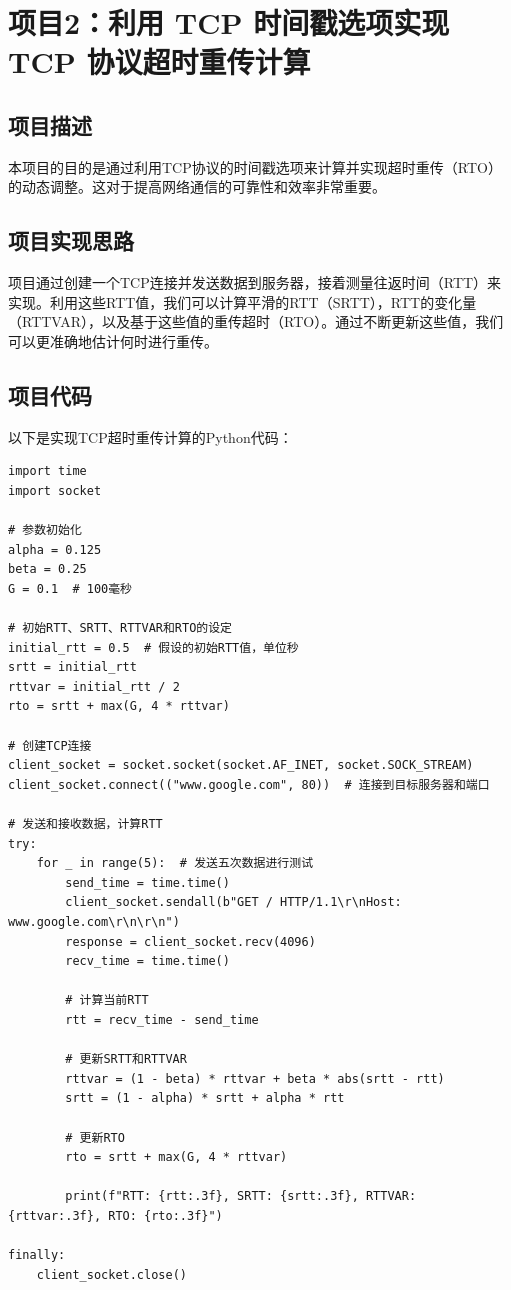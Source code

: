 \documentclass[UTF8,titlepage]{ctexart}
\numberwithin{figure}{section}
\begin{document}
\section{项目2：利用 TCP 时间戳选项实现 TCP 协议超时重传计算}

\subsection{项目描述}
本项目的目的是通过利用TCP协议的时间戳选项来计算并实现超时重传（RTO）的动态调整。这对于提高网络通信的可靠性和效率非常重要。

\subsection{项目实现思路}
项目通过创建一个TCP连接并发送数据到服务器，接着测量往返时间（RTT）来实现。利用这些RTT值，我们可以计算平滑的RTT（SRTT），RTT的变化量（RTTVAR），以及基于这些值的重传超时（RTO）。通过不断更新这些值，我们可以更准确地估计何时进行重传。

\subsection{项目代码}
以下是实现TCP超时重传计算的Python代码：

\begin{verbatim}
import time
import socket

# 参数初始化
alpha = 0.125
beta = 0.25
G = 0.1  # 100毫秒

# 初始RTT、SRTT、RTTVAR和RTO的设定
initial_rtt = 0.5  # 假设的初始RTT值，单位秒
srtt = initial_rtt
rttvar = initial_rtt / 2
rto = srtt + max(G, 4 * rttvar)

# 创建TCP连接
client_socket = socket.socket(socket.AF_INET, socket.SOCK_STREAM)
client_socket.connect(("www.google.com", 80))  # 连接到目标服务器和端口

# 发送和接收数据，计算RTT
try:
    for _ in range(5):  # 发送五次数据进行测试
        send_time = time.time()
        client_socket.sendall(b"GET / HTTP/1.1\r\nHost: www.google.com\r\n\r\n")
        response = client_socket.recv(4096)
        recv_time = time.time()

        # 计算当前RTT
        rtt = recv_time - send_time

        # 更新SRTT和RTTVAR
        rttvar = (1 - beta) * rttvar + beta * abs(srtt - rtt)
        srtt = (1 - alpha) * srtt + alpha * rtt

        # 更新RTO
        rto = srtt + max(G, 4 * rttvar)

        print(f"RTT: {rtt:.3f}, SRTT: {srtt:.3f}, RTTVAR: {rttvar:.3f}, RTO: {rto:.3f}")

finally:
    client_socket.close()
\end{verbatim}
\end{document}
